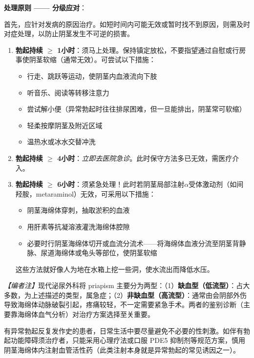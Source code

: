 \vspace{0.5em}
\noindent\textbf{处理原则 —— 分级应对}：

首先，应针对发病的原因治疗。如短时间内可能无效或暂时找不到原因，则需及时对症处理，以防止阴茎发生不可逆的损害。

\begin{enumerate}
	\item \textbf{勃起持续 $\geq$ 1小时}：须马上处理。保持镇定放松，不要指望通过自慰或行房事使阴茎软缩（通常无效）。可尝试以下措施：
	\begin{itemize}
		\item 行走、跳跃等运动，使阴茎内血液流向下肢
		\item 听音乐、阅读等转移注意力
		\item 尝试解小便（异常勃起时往往排尿困难，但一旦能排出，阴茎常可软缩）
		\item 轻柔按摩阴茎及附近区域
		\item 温热水或冰水交替冲洗
	\end{itemize}

	\item \textbf{勃起持续 $\geq$ 4小时}：\textit{立即去医院急诊}。此时保守方法多已无效，需医疗介入。

	\item \textbf{勃起持续 $\geq$ 6小时}：须紧急处理！此时若阴茎局部注射$\alpha$受体激动剂（如间羟胺，metaraminol）无效，可采用以下措施：
	\begin{itemize}
		\item 阴茎海绵体穿刺，抽取淤积的血液
		\item 用肝素等抗凝溶液灌洗海绵体腔隙
		\item 必要时行阴茎海绵体切开或血流分流术——将海绵体血液分流至阴茎背静脉、尿道海绵体或龟头等部位，使阴茎软缩
	\end{itemize}
	这些方法就好像人为地在水箱上挖一些洞，使水流出而降低水压。
\end{enumerate}

\noindent\textit{【编者注】}现代泌尿外科将 priapism 主要分为两型：（1）\textbf{缺血型（低流型）}：占大多数，为上述描述的类型，属急症；（2）\textbf{非缺血型（高流型）}：通常由会阴部外伤导致海绵体动脉破裂引起，疼痛较轻，不一定需要紧急手术。两者的鉴别诊断（主要靠海绵体血气分析）对治疗方案选择至关重要。

\begin{tcolorbox}[colback=pink!5!white,colframe=red!50!black,title=贴心小叮咛]
有异常勃起反复发作史的患者，日常生活中要尽量避免不必要的性刺激。如伴有勃起功能障碍须治疗者，只能采用心理疗法或口服 PDE5 抑制剂等规范方案，慎用阴茎海绵体内注射血管活性药（此类注射本身就是异常勃起的常见诱因之一）。
\end{tcolorbox}

